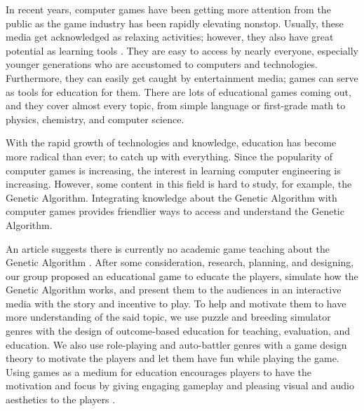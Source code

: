 \documentclass[12pt,oneside,openright,a4paper]{cpe-english-project}
\begin{document}
\hspace{2em}In recent years, computer games have been getting more attention from the public as the game industry has been rapidly elevating nonstop. Usually, these media get acknowledged as relaxing activities; however, they also have great potential as learning tools \cite{gomez2022academic}. They are easy to access by nearly everyone, especially younger generations who are accustomed to computers and technologies. Furthermore, they can easily get caught by entertainment media; games can serve as tools for education for them. There are lots of educational games coming out, and they cover almost every topic, from simple language or first-grade math to physics, chemistry, and computer science.

\hspace{2em}With the rapid growth of technologies and knowledge, education has become more radical than ever; to catch up with everything. Since the popularity of computer games is increasing, the interest in learning computer engineering is increasing. However, some content in this field is hard to study, for example, the Genetic Algorithm. Integrating knowledge about the Genetic Algorithm with computer games provides friendlier ways to access and understand the Genetic Algorithm.

\hspace{2em}An article suggests there is currently no academic game teaching about the Genetic Algorithm \cite{udeozor2022digital}. After some consideration, research, planning, and designing, our group proposed an educational game to educate the players, simulate how the Genetic Algorithm works, and present them to the audiences in an interactive media with the story and incentive to play. To help and motivate them to have more understanding of the said topic, we use puzzle and breeding simulator genres with the design of outcome-based education for teaching, evaluation, and education. We also use role-playing and auto-battler genres with a game design theory to motivate the players and let them have fun while playing the game. Using games as a medium for education encourages players to have the motivation and focus by giving engaging gameplay and pleasing visual and audio aesthetics to the players \cite{plass2015foundations}.
\end{document}
